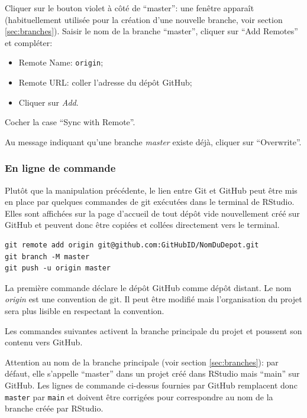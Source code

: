 \documentclass[
  12pt,
  french,
  a4paper,
  extrafontsizes,onecolumn,openright
  ]{memoir}
\providecommand{\tightlist}{%
  \setlength{\itemsep}{0pt}\setlength{\parskip}{0pt}}
\begin{document}
Cliquer sur le bouton violet à côté de \enquote{master}: une fenêtre apparaît (habituellement utilisée pour la création d'une nouvelle branche, voir section \ref{sec:branches}).
Saisir le nom de la branche \enquote{master}, cliquer sur \enquote{Add Remotes} et compléter:

\begin{itemize}
\tightlist
\item
  Remote Name: \texttt{origin};
\item
  Remote URL: coller l'adresse du dépôt GitHub;
\item
  Cliquer sur \emph{Add}.
\end{itemize}

Cocher la case \enquote{Sync with Remote}.

Au message indiquant qu'une branche \emph{master} existe déjà, cliquer sur \enquote{Overwrite}.

\hypertarget{en-ligne-de-commande}{%
\subsubsection{En ligne de commande}\label{en-ligne-de-commande}}

Plutôt que la manipulation précédente, le lien entre Git et GitHub peut être mis en place par quelques commandes de git exécutées dans le terminal de RStudio.
Elles sont affichées sur la page d'accueil de tout dépôt vide nouvellement créé sur GitHub et peuvent donc être copiées et collées directement vers le terminal.

\begin{verbatim}
git remote add origin git@github.com:GitHubID/NomDuDepot.git
git branch -M master
git push -u origin master
\end{verbatim}

La première commande déclare le dépôt GitHub comme dépôt distant.
Le nom \emph{origin} est une convention de git.
Il peut être modifié mais l'organisation du projet sera plus lisible en respectant la convention.

Les commandes suivantes activent la branche principale du projet et poussent son contenu vers GitHub.

Attention au nom de la branche principale (voir section \ref{sec:branches}): par défaut, elle s'appelle \enquote{master} dans un projet créé dans RStudio mais \enquote{main} sur GitHub.
Les lignes de commande ci-dessus fournies par GitHub remplacent donc \texttt{master} par \texttt{main} et doivent être corrigées pour correspondre au nom de la branche créée par RStudio.
\end{document}
